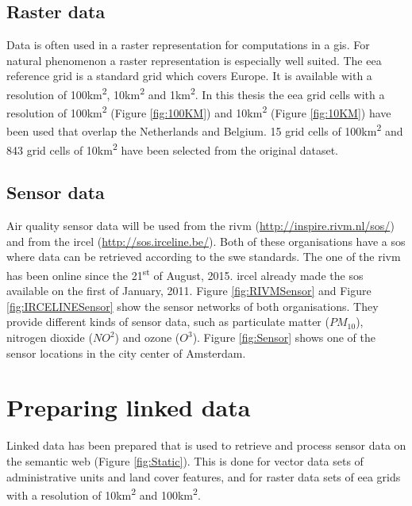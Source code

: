 \subsection{Raster data}
Data is often used in a raster representation for computations in a \ac{gis}. For natural phenomenon a raster representation is especially well suited. The \ac{eea} reference grid is a standard grid which covers Europe. It is available with a resolution of 100km\textsuperscript{2}, 10km\textsuperscript{2} and 1km\textsuperscript{2}. In this thesis the \ac{eea} grid cells with a resolution of 100km\textsuperscript{2} (Figure \ref{fig:100KM}) and 10km\textsuperscript{2} (Figure \ref{fig:10KM}) have been used that overlap the Netherlands and Belgium. 15 grid cells of 100km\textsuperscript{2} and 843 grid cells of 10km\textsuperscript{2} have been selected from the original dataset.  

\subsection{Sensor data}
Air quality sensor data will be used from the \ac{rivm} (\url{http://inspire.rivm.nl/sos/}) and from the \ac{ircel} (\url{http://sos.irceline.be/}). Both of these organisations have a \ac{sos} where data can be retrieved according to the \ac{swe} standards. The one of the \ac{rivm} has been online since the 21\textsuperscript{st} of August, 2015. \ac{ircel} already made the \ac{sos} available on the first of January, 2011. Figure \ref{fig:RIVMSensor} and Figure \ref{fig:IRCELINESensor} show the sensor networks of both organisations. They provide different kinds of sensor data, such as particulate matter ($PM_{10}$), nitrogen dioxide ($NO^{2}$) and ozone ($O^{3}$). Figure \ref{fig:Sensor} shows one of the sensor locations in the city center of Amsterdam. 

\section{Preparing linked data}
Linked data has been prepared that is used to retrieve and process sensor data on the semantic web (Figure \ref*{fig:Static}). This is done for vector data sets of administrative units and land cover features, and for raster data sets of \ac{eea} grids with a resolution of 10km\textsuperscript{2} and 100km\textsuperscript{2}. 

